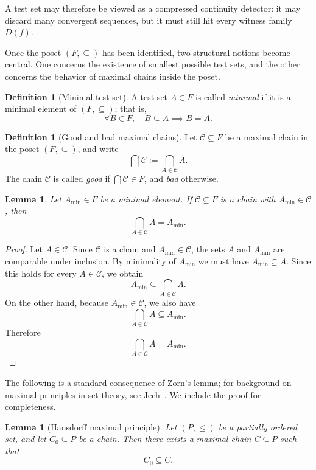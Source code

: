 \documentclass[11pt]{amsart}
\theoremstyle{plain}
\newtheorem{lemma}[theorem]{Lemma}
\theoremstyle{definition}
\newtheorem{definition}[theorem]{Definition}
\theoremstyle{remark}
\newcommand{\F}{\mathcal{F}}
\def\F{F}%
\begin{document}
A test set may therefore be viewed as a compressed continuity detector:
it may discard many convergent sequences, but it must still hit every witness family $D(f)$.


Once the poset $(\F,\subseteq)$ has been identified, two structural notions become central.
One concerns the existence of smallest possible test sets, and the other concerns the behavior of maximal chains inside the poset.

\begin{definition}[Minimal test set]\label{def:minimal_testset}
A test set $A\in\F$ is called \emph{minimal} if it is a minimal element of $(\F,\subseteq)$; that is,
\[
\forall B\in\F,\quad B\subseteq A \implies B=A.
\]
\end{definition}

\begin{definition}[Good and bad maximal chains]\label{def:goodbad}
Let $\mathcal C\subseteq\F$ be a maximal chain in the poset $(\F,\subseteq)$, and write
\[
\bigcap\mathcal C:=\bigcap_{A\in\mathcal C}A.
\]
The chain $\mathcal C$ is called \emph{good} if $\bigcap\mathcal C\in\F$, and \emph{bad} otherwise.
\end{definition}

\begin{lemma}\label{lem:min_chain_intersection}
Let $A_{\min}\in\F$ be a minimal element.
If $\mathcal C\subseteq\F$ is a chain with $A_{\min}\in\mathcal C$, then
\[
\bigcap_{A\in\mathcal C}A=A_{\min}.
\]
\end{lemma}

\begin{proof}
Let $A\in\mathcal C$.
Since $\mathcal C$ is a chain and $A_{\min}\in\mathcal C$, the sets $A$ and $A_{\min}$ are comparable under inclusion.
By minimality of $A_{\min}$ we must have $A_{\min}\subseteq A$.
Since this holds for every $A\in\mathcal C$, we obtain
\[
A_{\min}\subseteq \bigcap_{A\in\mathcal C}A.
\]
On the other hand, because $A_{\min}\in\mathcal C$, we also have
\[
\bigcap_{A\in\mathcal C}A\subseteq A_{\min}.
\]
Therefore
\[
\bigcap_{A\in\mathcal C}A=A_{\min}.
\]
\end{proof}
The following is a standard consequence of Zorn's lemma; for background on maximal principles in set theory, see Jech~\cite{Jec03}.
We include the proof for completeness.
\begin{lemma}[Hausdorff maximal principle]\label{lem:chain_extension}
Let $(P,\le)$ be a partially ordered set, and let $C_0\subseteq P$ be a chain.
Then there exists a maximal chain $C\subseteq P$ such that
\[
C_0\subseteq C.
\]
\end{lemma}
\end{document}
